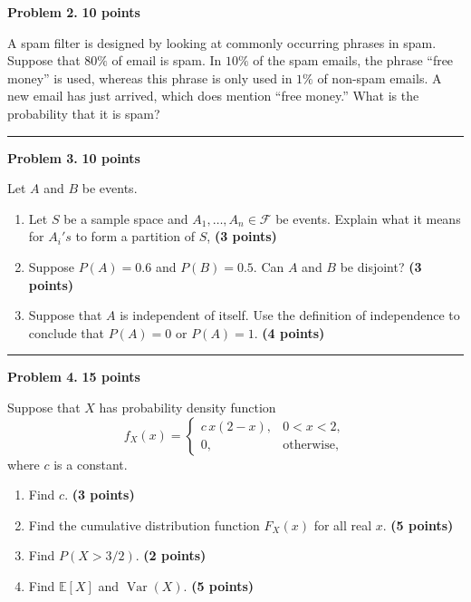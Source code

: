 \documentclass[11pt]{article}
\begin{document}
\newpage

\begin{problemheader}
\textbf{Problem 2.} \hfill \textbf{10 points}
\end{problemheader}

A spam filter is designed by looking at commonly occurring phrases in spam. Suppose that $80\%$ of email is spam. In $10\%$ of the spam emails, the phrase ``free money'' is used, whereas this phrase is only used in $1\%$ of non-spam emails. A new email has just arrived, which does mention ``free money.'' What is the probability that it is spam?
 
\hrule
 

\newpage
\begin{problemheader}
\textbf{Problem 3. } \hfill \textbf{10 points}
\end{problemheader}

Let $A$ and $B$ be events.

\begin{enumerate}[label=(\alph*),leftmargin=*]
    \item Let $S$ be a sample space and $A_1,\dots, A_n\in  \mathcal{F}$ be events. Explain what it means for $A_i's$ to form a partition of $S$,  \hfill \textbf{(3 points)}
    \item Suppose $P(A) = 0.6$ and $P(B)=0.5$. Can $A$ and $B$ be disjoint? \hfill \textbf{(3 points)}
   
    \item Suppose that $A$ is independent of itself. Use the definition of independence to conclude that $P(A)=0$ or $P(A)=1$. \hfill \textbf{(4 points)}
\end{enumerate}
 
\hrule
 
\newpage
\begin{problemheader}
\textbf{Problem 4. } \hfill \textbf{15 points}
\end{problemheader}

Suppose that $X$ has probability density function
\[
f_X(x)=
\begin{cases}
 c\,x(2-x), & 0<x<2,\\
 0, & \text{otherwise},
\end{cases}
\]
where $c$ is a constant.

\begin{enumerate}[label=(\alph*),leftmargin=*,itemsep=0.7em]
    \item Find $c$. \hfill \textbf{(3 points)}
    \item Find the cumulative distribution function $F_X(x)$ for all real $x$. \hfill \textbf{(5 points)}
    \item Find $P(X>3/2)$. \hfill \textbf{(2 points)}
    \item Find $\mathbb{E}[X]$ and $\operatorname{Var}(X)$. \hfill \textbf{(5 points)}
\end{enumerate}
\end{document}
